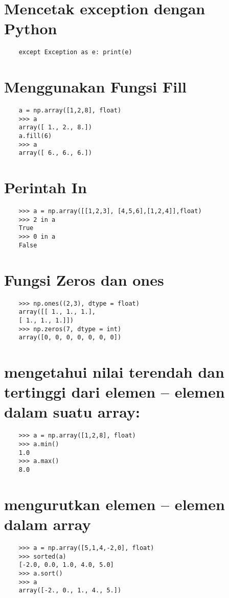\documentclass[12pt]{article} %
\begin{document}
\section {Mencetak exception dengan Python}
\begin{lstlisting}
	except Exception as e: print(e)
\end{lstlisting}

\section {Menggunakan Fungsi Fill}
\begin{lstlisting}
	a = np.array([1,2,8], float)
	>>> a
	array([ 1., 2., 8.])
	a.fill(6)
	>>> a
	array([ 6., 6., 6.])
\end{lstlisting}

\section {Perintah In}
\begin{lstlisting}
	>>> a = np.array([[1,2,3], [4,5,6],[1,2,4]],float)
	>>> 2 in a
	True
	>>> 0 in a
	False
\end{lstlisting}

\section {Fungsi Zeros dan ones}
\begin{lstlisting}
	>>> np.ones((2,3), dtype = float)
	array([[ 1., 1., 1.],
	[ 1., 1., 1.]])
	>>> np.zeros(7, dtype = int)
	array([0, 0, 0, 0, 0, 0, 0])
\end{lstlisting}

\section {mengetahui nilai terendah dan tertinggi dari elemen – elemen dalam
	suatu array:}
\begin{lstlisting}
	>>> a = np.array([1,2,8], float)
	>>> a.min()
	1.0
	>>> a.max()
	8.0
\end{lstlisting}


\section {mengurutkan elemen – elemen dalam array}
\begin{lstlisting}
	>>> a = np.array([5,1,4,-2,0], float)
	>>> sorted(a)
	[-2.0, 0.0, 1.0, 4.0, 5.0]
	>>> a.sort()
	>>> a
	array([-2., 0., 1., 4., 5.])
\end{lstlisting}
\end{document}
